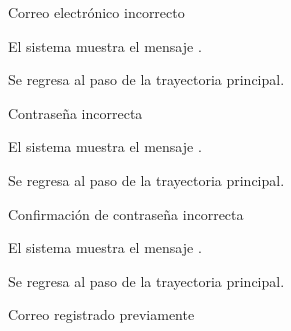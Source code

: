 {\begin{trayectoriaAlternativa}
  \end{trayectoriaAlternativa}


  \begin{trayectoriaAlternativa}
    {Correo electrónico incorrecto}

    \item El sistema muestra el mensaje
      .

    \item Se regresa al paso  de la trayectoria
      principal.

  \end{trayectoriaAlternativa}


  \begin{trayectoriaAlternativa}
    {Contraseña incorrecta}

    \item El sistema muestra el mensaje
      .

    \item Se regresa al paso  de la trayectoria
      principal.

  \end{trayectoriaAlternativa}


  \begin{trayectoriaAlternativa}
    {Confirmación de contraseña incorrecta}

    \item El sistema muestra el mensaje
      .

    \item Se regresa al paso  de la trayectoria
      principal.

  \end{trayectoriaAlternativa}


  \begin{trayectoriaAlternativa}
    {Correo registrado previamente}


\end{trayectoriaAlternativa}}
